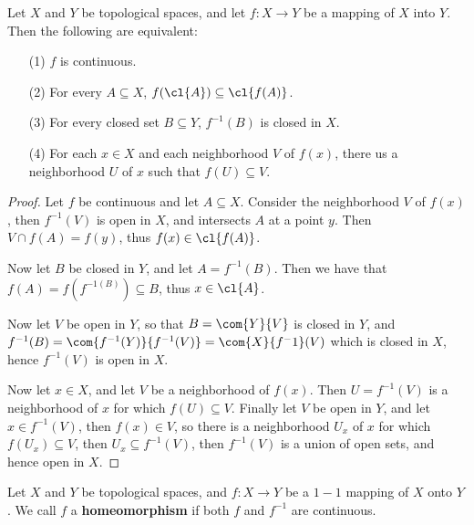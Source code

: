 \begin{theorem}\label{1.7.1}
    Let $X$ and  $Y$ be topological spaces, and let  $f:X \rightarrow Y$ be a mapping of  $X$ into
    $Y$. Then the following are equivalent:
        \begin{enumerate}
            \item[(1)] $f$ is continuous.

            \item[(2)] For every $A \subseteq X$,  $f(\cl{A}) \subseteq \cl{f(A)}$.

            \item[(3)] For every closed set $B \subseteq Y$,  $f^{-1}(B)$ is closed in $X$.

            \item[(4)] For each  $x \in X$ and each neighborhood  $V$ of  $f(x)$, there us a neighborhood
                $U$ of  $x$ such that  $f(U) \subseteq V$.
        \end{enumerate}
\end{theorem}
\begin{proof}
    Let $f$ be continuous and let  $A \subseteq X$. Consider the neighborhood  $V$ of  $f(x)$, then
    $f^{-1}(V)$ is open in $X$, and intersects  $A$ at a point  $y$. Then  $V \cap f(A)=f(y)$, thus
    $f(x) \in \cl{f(A)}$.

    Now let $B$ be closed in  $Y$, and let  $A=f^{-1}(B)$. Then we have that $f(A)=f(f^{-1(B)})
    \subseteq B$, thus $x \in \cl{A}$.

    Now let $V$ be open in $Y$, so that  $B=\com{Y}{V}$ is closed in $Y$, and
    $f^{-1}(B)=\com{f^{-1}(Y)}{f^{-1}(V)}=\com{X}{f^-1}(V)$ which is closed in $X$, hence
    $f^{-1}(V)$ is open in $X$.

    Now let  $x \in X$, and let  $V$ be a neighborhood of  $f(x)$. Then $U=f^{-1}(V)$ is a
    neighborhood of $x$ for which  $f(U) \subseteq V$. Finally let $V$ be open in  $Y$, and let $x
    \in f^{-1}(V)$, then $f(x) \in V$, so  there is a neighborhood $U_x$ of  $x$ for which  $f(U_x) \subseteq V$,
    then $U_x \subseteq f^{-1}(V)$, then $f^{-1}(V)$ is a union of open sets, and hence open in $X$.
\end{proof}

\begin{definition}
    Let $X$ and  $Y$ be topological spaces, and  $f:X \rightarrow Y$ be a $1-1$ mapping of  $X$ onto
    $Y$. We call  $f$ a \textbf{homeomorphism} if both $f$ and  $f^{-1}$ are continuous.
\end{definition}

